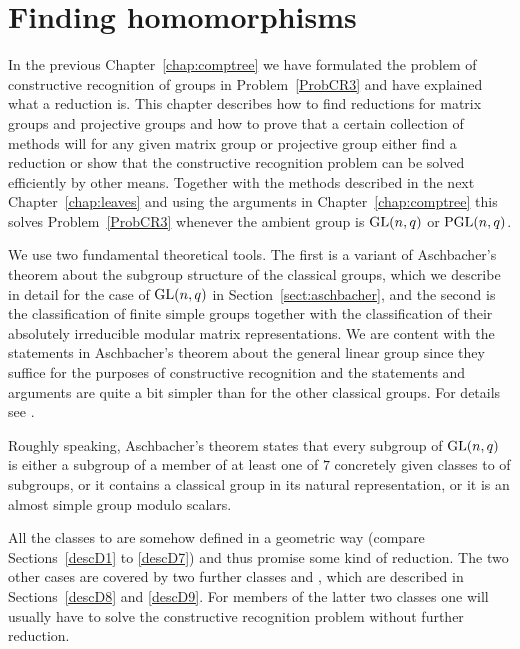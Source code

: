 
\chapter{Finding homomorphisms}
\label{chap:findhom}

In the previous Chapter~\ref{chap:comptree} we have formulated the problem
of constructive recognition of groups in Problem~\ref{ProbCR3} and have
explained what a reduction is. This chapter describes how to find
reductions for matrix groups and projective groups and how to prove
that a certain collection of methods will for any given
matrix group or projective group either find a reduction
or show that the constructive 
recognition problem can be solved efficiently by other means. Together
with the methods described in the next Chapter~\ref{chap:leaves}
and using the 
arguments in Chapter~\ref{chap:comptree} this solves
Problem~\ref{ProbCR3} whenever the ambient group is $\GL(n,q)$ or
$\PGL(n,q)$.

We use two fundamental theoretical tools. The first is a variant of
Aschbacher's theorem
about the subgroup structure of the classical groups, which we describe
in detail for the case of $\GL(n,q)$ in Section~\ref{sect:aschbacher},
and the second is the classification of finite simple groups together
with the classification of their absolutely irreducible modular matrix
representations. We are
content with the statements in Aschbacher's theorem about the general
linear group since they suffice for the purposes of constructive
recognition and the statements and arguments are quite a bit simpler
than for the other classical groups. For details see \cite{aschbacher}.

Roughly speaking, Aschbacher's theorem states that every subgroup of $\GL(n,q)$
is either a subgroup of a member of at least one of $7$ concretely given
classes  to  of subgroups, or it contains a classical group
in its natural representation, or it is an almost simple group modulo
scalars.

All the classes  to  are somehow defined in a geometric way
(compare
Sections~\ref{descD1} to \ref{descD7}) and thus promise some kind of
reduction. The two other cases are covered by two further classes 
and , which are described in Sections~\ref{descD8} and \ref{descD9}.
For members of the latter two classes one will usually have to solve the
constructive recognition problem without further reduction.

